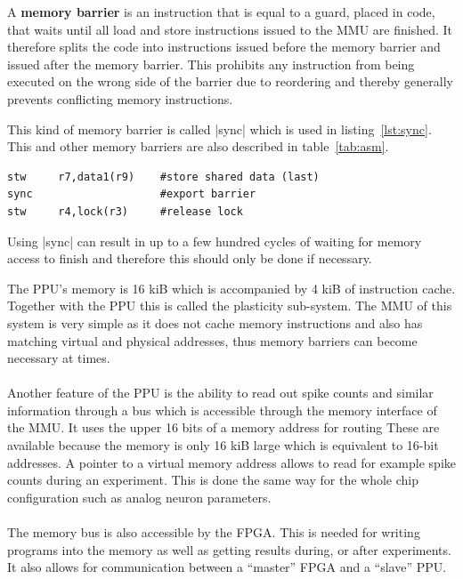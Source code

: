 {A \textbf{memory barrier} is an instruction that is equal to a guard, placed in code, that waits until all load and store instructions issued to the \ac{MMU} are finished.
It therefore splits the code into instructions issued before the memory barrier and issued after the memory barrier.
This prohibits any instruction from being executed on the wrong side of the barrier due to reordering and thereby generally prevents conflicting memory instructions.

This kind of memory barrier is called |sync| which is used in listing~\ref{lst:sync}.
This and other memory barriers are also described in table~\ref{tab:asm}.

\begin{lstlisting}[caption=The memory barrier ensures that the first store has been performed before the second store is issued., label=lst:sync]
stw     r7,data1(r9)    #store shared data (last)
sync                    #export barrier
stw     r4,lock(r3)     #release lock
\end{lstlisting}

Using |sync| can result in up to a few hundred cycles of waiting for memory access to finish and therefore this should only be done if necessary.

The \ac{PPU}'s memory is 16 kiB which is accompanied by 4 kiB of instruction cache.
Together with the \ac{PPU} this is called the plasticity sub-system.
The \ac{MMU} of this system is very simple as it does not cache memory instructions and also has matching virtual and physical addresses, thus memory barriers can become necessary at times.
\\
\\
Another feature of the \ac{PPU} is the ability to read out spike counts and similar information through a bus which is accessible through the memory interface of the \ac{MMU}.
It uses the upper 16 bits of a memory address for routing
These are available because the memory is only 16 kiB large which is equivalent to 16-bit addresses.
A pointer to a virtual memory address allows to read for example spike counts during an experiment.
This is done the same way for the whole chip configuration such as analog neuron parameters.
\\
\\
The memory bus is also accessible by the \ac{FPGA}.
This is needed for writing programs into the memory as well as getting results during, or after experiments.
It also allows for communication between a ``master'' \ac{FPGA} and a ``slave'' \ac{PPU}.

}
